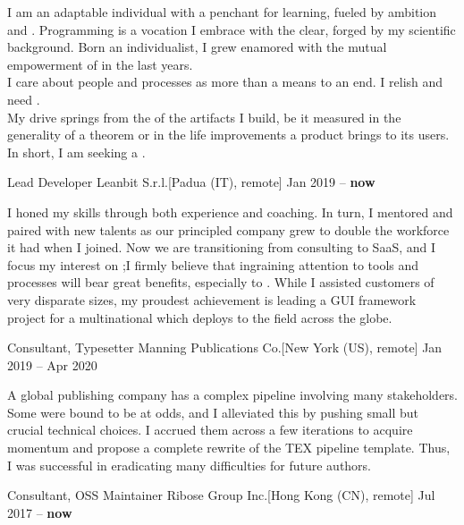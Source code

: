 \documentclass[9pt]{scrartcl}
\def\Phi{1.618}
\newlength{\Pad}\setlength{\Pad}{14.562pt} %
\begin{document}

I am an adaptable individual with a penchant for learning, fueled by ambition
and .
Programming is a vocation I embrace with the clear, 
forged by my scientific background.
Born an individualist, I grew enamored with the mutual empowerment of
 in the last years.\\[\smallskipamount]
I care about people and processes as more than a means to an end.
I relish and need .\\
My drive springs from the  of the artifacts I build, be
it measured in the generality of a theorem or in the life improvements a
product brings to its users. In short, I am seeking a .

\Event
  {Lead Developer}
  {Leanbit S.r.l.}[Padua (IT), remote]
  {Jan 2019 -- \textbf{now}}

I honed my  skills through both experience and coaching. In
turn, I mentored and paired with new talents as our  principled company
grew to double the workforce it had when I joined.
%
Now we are transitioning from consulting to SaaS, and I focus my interest on
;\linebreak I firmly believe that ingraining attention to tools
and processes will bear great benefits, especially to .
%
While I assisted customers of very disparate sizes, my proudest achievement is
leading a GUI framework project for a multinational which deploys to the field
across the globe.

\smallskip

\Event
  {Consultant, Typesetter}
  {Manning Publications Co.}[New York (US), remote]
  {Jan 2019 -- Apr 2020}

A global publishing company has a complex pipeline involving many stakeholders.
Some were bound to be at odds, and I alleviated this by pushing small but
crucial technical choices.
%
I  accrued them across a few iterations
to acquire momentum and propose a complete rewrite of the TEX pipeline template.
Thus, I was successful in eradicating many difficulties for future authors.

\smallskip

\Event
  {Consultant, OSS Maintainer}
  {Ribose Group Inc.}[Hong Kong (CN), remote]
  {Jul 2017 -- \textbf{now}}
\end{document}
